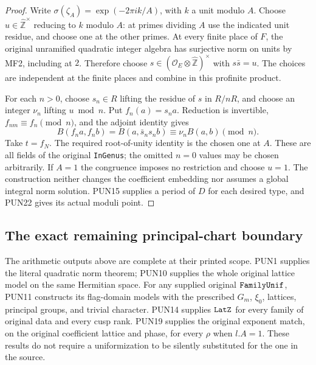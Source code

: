 \documentclass[11pt,a4paper]{article}
\numberwithin{equation}{section}
\theoremstyle{remark}\newtheorem{remark}[theorem]{Remark}
\begin{document}
\begin{proof}
Write \(\sigma(\zeta_A)=\exp(-2\pi i k/A)\), with
\(k\) a unit modulo \(A\).  Choose
\(u\in\widehat{\mathbb Z}^{\times}\) reducing to \(k\)
modulo \(A\): at primes dividing \(A\) use the indicated
unit residue, and choose one at the other primes.
At every finite place of \(F\), the original unramified
quadratic integer algebra has surjective norm on units by
MF2, including at \(2\).  Therefore choose
\(s\in(\mathcal O_E\otimes\widehat{\mathbb Z})^\times\)
with \(s\bar s=u\).  The choices are independent at the
finite places and combine in this profinite product.

For each \(n>0\), choose \(s_n\in R\) lifting the residue
of \(s\) in \(R/nR\), and choose an integer \(\nu_n\)
lifting \(u\bmod n\).  Put \(f_n(a)=s_na\).
Reduction is invertible, \(f_{nm}\equiv f_n\pmod n\), and
the adjoint identity gives
\[
 B(f_na,f_nb)=B(a,\bar s_ns_nb)
                              \equiv\nu_nB(a,b)\pmod n.
\]
Take \(t=f_N\).  The required root-of-unity identity is the
chosen one at \(A\).  These are all fields of the original
\texttt{In\allowbreak Genus}; the omitted \(n=0\) values may be chosen
arbitrarily.  If \(A=1\) the congruence imposes no restriction
and choose \(u=1\).  The construction neither changes the
coefficient embedding nor assumes a global integral norm
solution.  PUN15 supplies a period of \(D\) for each desired
type, and PUN22 gives its actual moduli point.
\end{proof}

\subsection{The exact remaining principal-chart boundary}

The arithmetic outputs above are complete at their printed
scope.  PUN1 supplies the literal quadratic norm theorem;
PUN10 supplies the whole original lattice model on the same
Hermitian space.  For any supplied original
\(\texttt{Family\allowbreak Unif}\), PUN11 constructs its flag-domain
models with the prescribed \(G_m\), \(\xi_0\), lattices,
principal groups, and trivial character.  PUN14 supplies
\(\texttt{Lat\allowbreak Z}\) for every family of original data and every
cusp rank.  PUN19 supplies the original exponent match,
on the original coefficient lattice and phase, for every
\(\rho\) when \(l.A=1\).  These results do not require a
uniformization to be silently substituted for the one in the
source.
\end{document}
